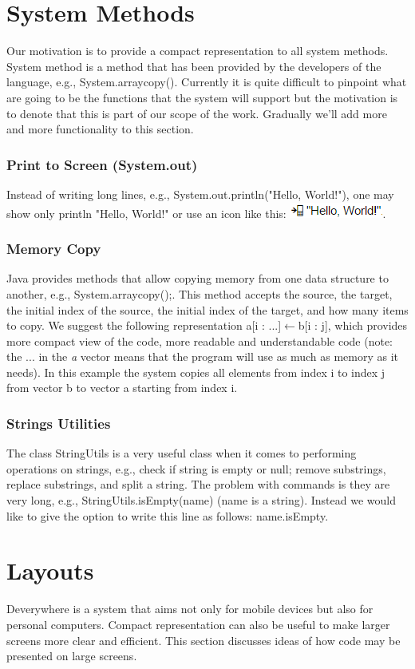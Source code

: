 \section{System Methods}
Our motivation is to provide a compact representation to all system methods. System method is a method that has been provided by the developers of the language, e.g., System.arraycopy(). Currently it is quite difficult to pinpoint what are going to be the functions that the system will support but the motivation is to denote that this is part of our scope of the work. Gradually we'll add more and more functionality to this section.
\subsubsection{Print to Screen (System.out)}
Instead of writing long lines, e.g., System.out.println("Hello, World!"), one may show only println "Hello, World!" or use an icon like this: \includegraphics{"./fig/System Out Hello World"}.
\subsubsection{Memory Copy}
Java provides methods that allow copying memory from one data structure to another, e.g., System.arraycopy();. This method accepts the source, the target, the initial  index of the source, the initial index of the target, and how many items to copy. We suggest the following representation a[i : ...]$ \leftarrow $b[i : j], which provides more compact view of the code, more readable and understandable code (note: the ... in the \textit{a} vector means that the program will use as much as memory as it needs). In this example the system copies all elements from index i to index j from vector b to vector a starting from index i.
\subsubsection{Strings Utilities}
The class StringUtils is a very useful class when it comes to performing operations on strings, e.g., check if string is empty or null; remove substrings, replace substrings, and split a string. The problem with commands is they are very long, e.g., StringUtils.isEmpty(name) (name is a string). Instead we would like to give the option to write this line as follows: name.isEmpty.
\section{Layouts}
Deverywhere is a system that aims not only for mobile devices but also for personal computers. Compact representation can also be useful to make larger screens more clear and efficient. This section discusses ideas of how code may be presented on large screens.
